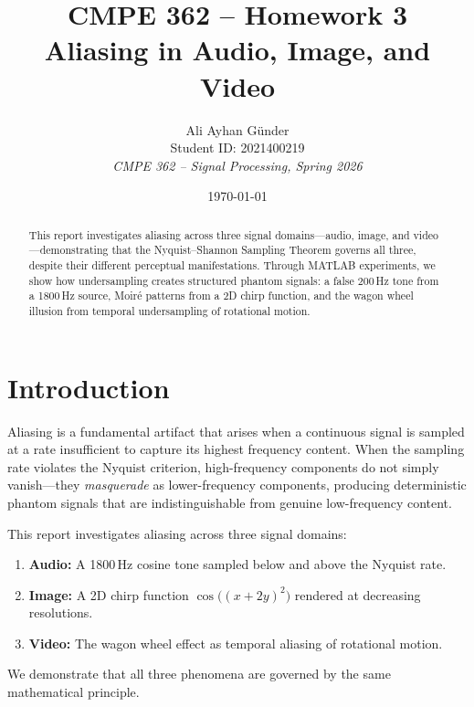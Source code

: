 \documentclass[12pt, a4paper]{article}
\title{
    \vspace{-1cm}
    \textbf{CMPE 362 -- Homework 3} \\[0.3cm]
    \Large Aliasing in Audio, Image, and Video
}
\author{
    Ali Ayhan Günder \\
    Student ID: 2021400219 \\[0.2cm]
    \textit{CMPE 362 -- Signal Processing, Spring 2026}
}
\date{\today}
\begin{document}
\maketitle
\thispagestyle{fancy}

\begin{abstract}
This report investigates aliasing across three signal domains---audio, image, and video---demonstrating that the Nyquist--Shannon Sampling Theorem governs all three, despite their different perceptual manifestations. Through MATLAB experiments, we show how undersampling creates structured phantom signals: a false 200\,Hz tone from a 1800\,Hz source, Moir\'{e} patterns from a 2D chirp function, and the wagon wheel illusion from temporal undersampling of rotational motion.
\end{abstract}

\tableofcontents
\newpage

\section{Introduction}

Aliasing is a fundamental artifact that arises when a continuous signal is sampled at a rate insufficient to capture its highest frequency content. When the sampling rate violates the Nyquist criterion, high-frequency components do not simply vanish---they \emph{masquerade} as lower-frequency components, producing deterministic phantom signals that are indistinguishable from genuine low-frequency content.

This report investigates aliasing across three signal domains:
\begin{enumerate}[label=(\alph*)]
    \item \textbf{Audio:} A 1800\,Hz cosine tone sampled below and above the Nyquist rate.
    \item \textbf{Image:} A 2D chirp function $\cos\!\big((x+2y)^2\big)$ rendered at decreasing resolutions.
    \item \textbf{Video:} The wagon wheel effect as temporal aliasing of rotational motion.
\end{enumerate}

We demonstrate that all three phenomena are governed by the same mathematical principle.

\end{document}
